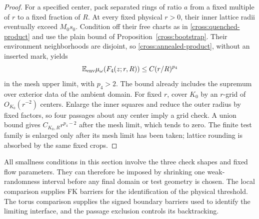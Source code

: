 \begin{proof}
For a specified center, pack separated rings of ratio $a$ from a fixed
multiple of $r$ to a fixed fraction of $R$.  At every fixed physical
$r>0$, their inner lattice radii eventually exceed $M_0s_0$.
Condition off their free charts as in \eqref{cross:quenched-product}
and use the plain bound of Proposition~\ref{cross:bootstrap}.
Their environment neighborhoods are disjoint, so
\eqref{cross:annealed-product}, without an inserted mark, yields
\[
 \mathbb E_{\rm env}\mu_\omega(F_4(z;r,R))\leq C(r/R)^{p_4}
\]
in the mesh upper limit, with $p_4>2$.  The bound already includes the
supremum over exterior data of the ambient domain.  For fixed $r$,
cover $K_0$ by an $r$-grid of $O_{K_0}(r^{-2})$ centers.  Enlarge the
inner squares and reduce the outer radius by fixed factors, so four
passages about any center imply a grid check.  A union bound gives
$C_{K_0,R}r^{p_4-2}$ after the mesh limit, which tends to zero.  The
finite test family is enlarged only after its mesh limit has been taken;
lattice rounding is absorbed by the same fixed crops.
\end{proof}

All smallness conditions in this section involve the three check shapes
and fixed flow parameters.  They can therefore be imposed by shrinking
one weak-randomness interval before any final domain or test geometry
is chosen.  The local comparison supplies FK barriers for the
identification of the physical threshold.  The torus comparison supplies
the signed boundary barriers used to identify the limiting interface,
and the passage exclusion controls its backtracking.
